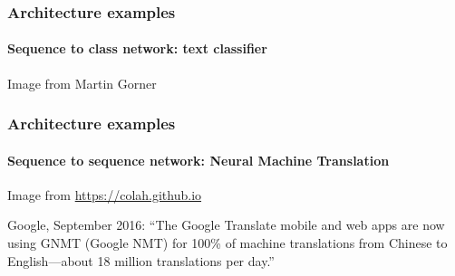 \documentclass[9pt]{beamer}
\begin{document}
\begin{frame}
  \frametitle{Architecture examples}

  \framesubtitle{Sequence to class network: text classifier}

  \begin{center}
  \end{center}

  {\small Image from Martin Gorner}
\end{frame}

\begin{frame}
  \frametitle{Architecture examples}

  \framesubtitle{Sequence to sequence network: Neural Machine Translation}

  \begin{center}
  \end{center}

  {\small Image from \url{https://colah.github.io}}

  \bigskip

  Google, September 2016: ``The Google Translate mobile and web apps
  are now using GNMT (Google NMT) for 100\% of machine translations
  from Chinese to English—about 18 million translations per day.''

\end{frame}
\end{document}
